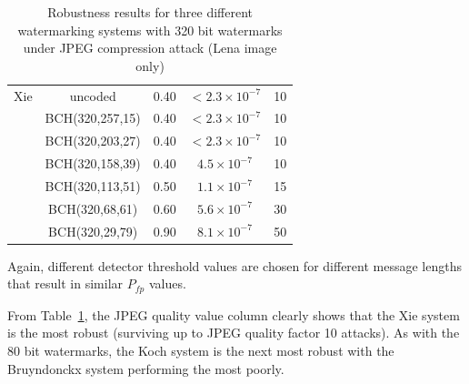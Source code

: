 \documentclass[12pt]{report}
\begin{document}
\begin{table}[!ht]
\begin{center}
\begin{tabular}{|c|c|c|c|c|}
                Xie     & uncoded               & 0.40                  & $< 2.3\times 10^{-7}$ 	& 10\\ \cline{2-5}
                        & BCH(320,257,15)       & 0.40                  & $< 2.3\times 10^{-7}$ 	& 10\\ \cline{2-5}
                        & BCH(320,203,27)       & 0.40                  & $< 2.3\times 10^{-7}$ 	& 10\\ \cline{2-5}
                        & BCH(320,158,39)       & 0.40                  & $4.5\times 10^{-7}$   	& 10\\ \cline{2-5}
                        & BCH(320,113,51)       & 0.50                  & $1.1\times 10^{-7}$   	& 15\\ \cline{2-5}
                        & BCH(320,68,61)        & 0.60                  & $5.6\times 10^{-7}$   	& 30\\ \cline{2-5}
                        & BCH(320,29,79)        & 0.90                  & $8.1\times 10^{-7}$   	& 50\\ \hline
                \end{tabular}
	\caption{Robustness results for three different watermarking systems with 320 bit watermarks under JPEG
	compression attack (Lena image only)}
        \label{tab:320ResBKX}
        \end{center}
\end{table}
Again, different detector threshold values are chosen for different message lengths that result in 
similar $P_{fp}$ values. 

From Table~\ref{tab:320ResBKX}, the JPEG quality value column clearly shows that the Xie system is
the most robust (surviving up to JPEG quality factor 10 attacks). As with the 80 bit watermarks, the Koch 
system is the next most robust with the Bruyndonckx system performing the most poorly. 
\end{document}
